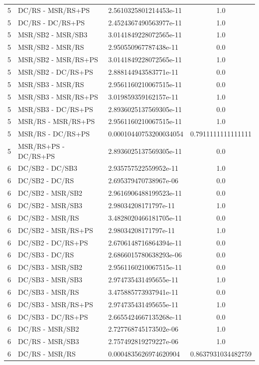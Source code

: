 \documentclass[10pt,a4paper]{article}
\begin{document}
\begin{longtable}{c l l c}
5 & DC/RS - MSR/RS+PS & 2.5610325801214453e-11 & 1.0 \\
5 & DC/RS - DC/RS+PS & 2.4524367490563977e-11 & 1.0 \\
5 & MSR/SB2 - MSR/SB3 & 3.0141849228072565e-11 & 1.0 \\
5 & MSR/SB2 - MSR/RS & 2.950550967787438e-11 & 0.0 \\
5 & MSR/SB2 - MSR/RS+PS & 3.0141849228072565e-11 & 1.0 \\
5 & MSR/SB2 - DC/RS+PS & 2.888144943583771e-11 & 0.0 \\
5 & MSR/SB3 - MSR/RS & 2.9561160210067515e-11 & 0.0 \\
5 & MSR/SB3 - MSR/RS+PS & 3.019859359162157e-11 & 1.0 \\
5 & MSR/SB3 - DC/RS+PS & 2.8936025137569305e-11 & 0.0 \\
5 & MSR/RS - MSR/RS+PS & 2.9561160210067515e-11 & 1.0 \\
5 & MSR/RS - DC/RS+PS & 0.00010440753200034054 & 0.7911111111111111 \\
5 & MSR/RS+PS - DC/RS+PS & 2.8936025137569305e-11 & 0.0 \\
\midrule
6 & DC/SB2 - DC/SB3 & 2.935757522559952e-11 & 1.0 \\
6 & DC/SB2 - DC/RS & 2.695379470738967e-06 & 0.0 \\
6 & DC/SB2 - MSR/SB2 & 2.9616906488199523e-11 & 0.0 \\
6 & DC/SB2 - MSR/SB3 & 2.98034208171797e-11 & 1.0 \\
6 & DC/SB2 - MSR/RS & 3.4828020466181705e-11 & 0.0 \\
6 & DC/SB2 - MSR/RS+PS & 2.98034208171797e-11 & 1.0 \\
6 & DC/SB2 - DC/RS+PS & 2.6706148716864394e-11 & 0.0 \\
6 & DC/SB3 - DC/RS & 2.6866015780638293e-06 & 0.0 \\
6 & DC/SB3 - MSR/SB2 & 2.9561160210067515e-11 & 0.0 \\
6 & DC/SB3 - MSR/SB3 & 2.974735431495655e-11 & 1.0 \\
6 & DC/SB3 - MSR/RS & 3.475885773937941e-11 & 0.0 \\
6 & DC/SB3 - MSR/RS+PS & 2.974735431495655e-11 & 1.0 \\
6 & DC/SB3 - DC/RS+PS & 2.6655424667135268e-11 & 0.0 \\
6 & DC/RS - MSR/SB2 & 2.727768745173502e-06 & 1.0 \\
6 & DC/RS - MSR/SB3 & 2.757492819279227e-06 & 1.0 \\
6 & DC/RS - MSR/RS & 0.0004835626974620904 & 0.8637931034482759 \\

\end{longtable}
\end{document}
